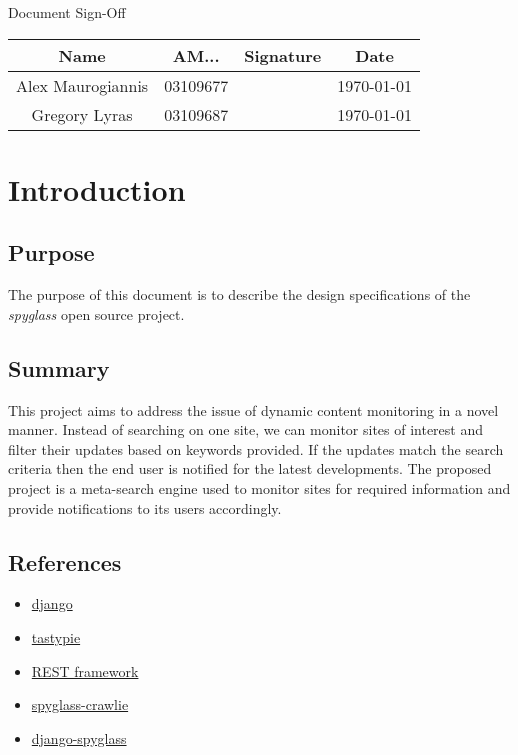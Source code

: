 




\tableofcontents

\pagebreak

\large{Document Sign-Off}

\begin{table}[h]
    \begin{tabular}{| c | c | c | c |}
        \hline
        Name & AM... & Signature & Date \\
        \hline
        Alex Maurogiannis & 03109677 & & \today \\
        \hline
        Gregory Lyras & 03109687 & & \today \\
        \hline
    \end{tabular}
\end{table}

\chapter{Introduction}

    \section{Purpose}
        The purpose of this document is to describe the design specifications
        of the \emph{spyglass} open source project.
    \section{Summary}
        This project aims to address the issue of dynamic content monitoring
        in a novel manner. Instead of searching on one site, we can monitor
        sites of interest and filter their updates based on keywords provided.
        If the updates match the search criteria then the end user is notified
        for the latest developments. The proposed project is a meta-search
        engine used to monitor sites for required information and provide
        notifications to its users accordingly. 
    \section{References}
        \begin{itemize}
                \item \href{https://www.djangoproject.com/}{django}
                \item \href{http://tastypieapi.org/}{tastypie}
                \item
                    \href{https://en.wikipedia.org/wiki/Representational_state_transfer}{REST framework}
                \item \href{https://github.com/mastergreg/spyglass-crawlie}{spyglass-crawlie}
                \item \href{https://github.com/afein/django-spyglass}{django-spyglass}
        \end{itemize}

